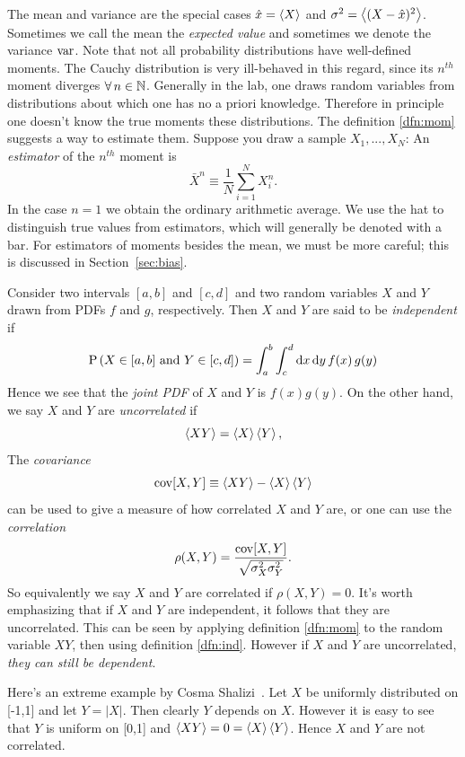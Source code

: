 The mean and variance are the special cases $\hat{x}=\ev{X}$ and 
$\sigma^2=\ev{(X-\hat{x})^2}$. Sometimes we call the mean the {\it expected
value} and sometimes we denote the variance $\operatorname{var}$. Note that not all 
probability distributions have well-defined moments. The Cauchy distribution is
very ill-behaved in this regard, since its $n^{th}$ moment diverges
$\operatorname{\forall} n\in\mathbb{N}$.
Generally in the lab, one draws random variables from distributions
about which one has no a priori knowledge. Therefore in principle one
doesn't know the true moments these distributions. The
definition \eqref{dfn:mom} suggests a way to estimate them. 
Suppose you draw a sample $X_1,...,X_N$:
  An {\it estimator} of the $n^{th}$ moment is
  \begin{equation}
    \bar{X}^n\equiv\frac{1}{N}\sum_{i=1}^N X_i^n.
  \end{equation}
In the case $n=1$ we obtain the ordinary arithmetic average.
We use the hat to distinguish true values from estimators, which will
generally be denoted with a bar. For estimators of moments besides the
mean, we must be more careful; this is discussed in Section~\ref{sec:bias}.

Consider two intervals $[a,b]$ and $[c,d]$ and two random variables
$X$ and $Y$ drawn from PDFs $f$ and $g$, respectively. Then $X$ and $Y$ are
said to be {\it independent} if
\begin{equation}\label{dfn:ind}
  \operatorname{P}\left(X\in[a,b]\text{ and }Y\in[c,d]\right)=\int_a^b\int_c^d\dd{x}\dd{y}f(x)\,g(y)
\end{equation}
Hence we see that the {\it joint PDF} of $X$ and $Y$ 
is $f(x)g(y)$. On the other hand, we say $X$ and $Y$ are {\it uncorrelated} 
 if
\begin{equation}
  \ev{XY}=\ev{X}\ev{Y},
\end{equation}
The {\it covariance}
\begin{equation}\label{dfn:cov}
  \Cov[X,Y]\equiv\ev{XY}-\ev{X}\ev{Y}
\end{equation}
can be used to give a measure of how correlated $X$ and $Y$ are, or
one can use the {\it correlation}
\begin{equation}\label{dfn:cor}
  \rho(X,Y)=\frac{\operatorname{cov}[X,Y]}{\sqrt{\sigma^2_X\sigma^2_Y}}.
\end{equation}
So equivalently we say $X$ and $Y$ are correlated if $\rho(X,Y)=0$.
It's worth emphasizing that if $X$ and $Y$ are independent,
it follows that they are uncorrelated. This can be seen by applying
definition \eqref{dfn:mom} to the random variable $XY$, then using
definition \eqref{dfn:ind}. However if $X$ and $Y$ are
uncorrelated, {\it they can still be dependent}.
\begin{example*}{}{}
  Here's an extreme example by Cosma Shalizi~\cite{cosma_indep}. 
Let $X$ be uniformly distributed
  on [-1,1] and let $Y=|X|$. Then clearly $Y$ depends on $X$. However it 
  is easy to see that $Y$ is uniform on [0,1] and $\ev{XY}=0=\ev{X}\ev{Y}$. 
  Hence $X$ and $Y$ are not correlated.
\end{example*}

